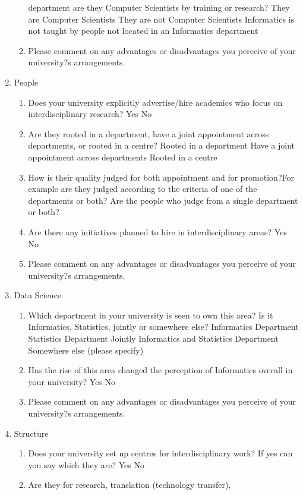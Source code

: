 \begin{enumerate}
\begin{enumerate}
 department are they Computer Scientists by training or research?
They are Computer Scientists
They are not Computer Scientists
Informatics is not taught by people not located in an Informatics department
\item Please comment on any advantages or disadvantages you perceive of your university?s arrangements.
\end{enumerate}
\item People
\begin{enumerate}
\item Does your university explicitly advertise/hire academics who focus
on interdisciplinary research?
Yes
No
\item  Are they rooted in a department, have a joint appointment across
departments, or rooted in a centre?
Rooted in a department
Have a joint appointment across departments
Rooted in a centre
\item How is their quality judged for both appointment and for promotion?For example are they judged according to the criteria of one
of the departments or both? Are the people who judge from a single
department or both?
\item Are there any initiatives planned to hire in interdisciplinary areas?
Yes
No
\item Please comment on any advantages or disadvantages you perceive of your university?s arrangements.
\end{enumerate}
\item Data Science
\begin{enumerate}
\item Which department in your university is seen to own this area? Is it
Informatics, Statistics, jointly or somewhere else?
Informatics Department
Statistics Department
Jointly Informatics and Statistics Department
Somewhere else (please specify)
\item Has the rise of this area changed the perception of Informatics
overall in your university?
Yes
No
\item Please comment on any advantages or disadvantages you perceive of
your university?s arrangements.
\end{enumerate}
\item Structure
\begin{enumerate}
\item Does your university set up centres for interdisciplinary work? If
yes can you say which they are?
Yes
No
\item Are they for research, translation (technology transfer),

\end{enumerate}
\end{enumerate}
